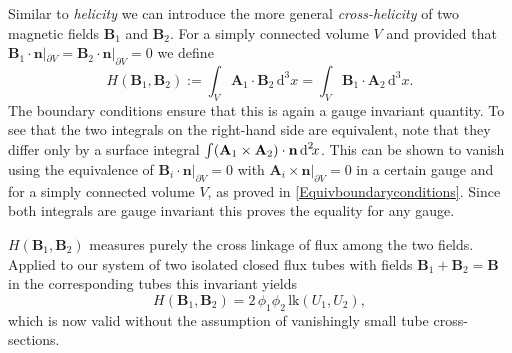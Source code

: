 \documentclass[10pt]{iopart}
\def \d{\mbox{d}}
\def \dxx{\,\d^{2}\!x}
\def \dxxx{\,\d^{3}\!x}
\def \text{\mbox}
\def \bA{{\mathbf{A}}}
\def \bB{{\mathbf{B}}}
\def \bn{{\mathbf{n}}}
\begin{document}
Similar to {\em helicity} we can introduce the more general
{\em cross-helicity} of two magnetic fields $\bB_1$ and $\bB_2$. For a simply connected volume $V$ and provided that $\bB_1 \cdot \bn|_{\partial V} =\bB_2 \cdot \bn|_{\partial V} = 0$  we define 
\begin{equation}
   H(\bB_1,\bB_2) := \int_V \bA_1\cdot\bB_2 \dxxx
                  = \int_V \bB_1\cdot\bA_2 \dxxx . \label{crosshelicity}
\end{equation}
The boundary conditions ensure that this is again a gauge invariant quantity.
To see that the two integrals on the right-hand side
are equivalent, note that they differ only by a surface integral $\int
(\bA_1 \times \bA_2)\cdot {\bf n}  \dxx$.
This can be shown to vanish
using the equivalence of 
$\bB_i \cdot \bn|_{\partial V}=0$ with 
$\bA_i \times \bn|_{\partial V}=0$
in a 
certain gauge 
and for a simply connected volume $V$,
as proved in \ref{Equivboundaryconditions}.
Since both
integrals are gauge invariant this proves the equality for any gauge.

$ H(\bB_1,\bB_2)$ measures purely the cross linkage of flux among the
two fields.
Applied to our system of two isolated closed flux tubes with fields 
$\bB_1 + \bB_2 = \bB$ in the corresponding tubes this invariant yields
\begin{equation}
   H(\bB_1,\bB_2) = 2\,\phi_1\phi_2\,\text{lk}(U_1,U_2),
\end{equation}
which is now valid without the assumption of vanishingly small tube
cross-sections.
\end{document}
